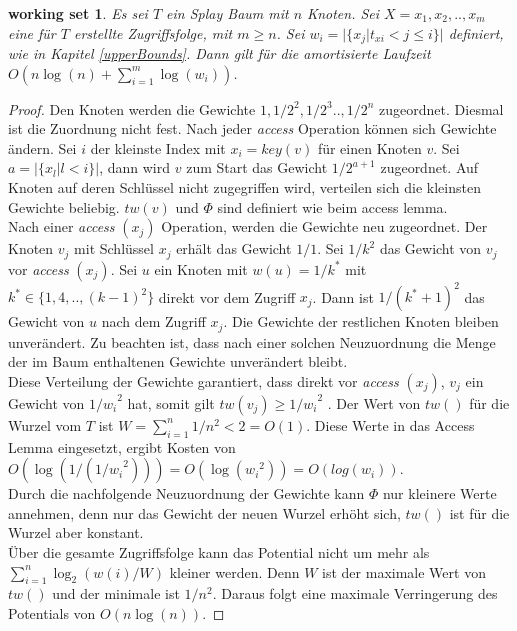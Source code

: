 \documentclass[a4paper,12pt]{article}
\begin{document}
\newtheorem{Satz2}{working set}[section] \label{workingSetSplay}
\begin{Satz2} Es sei $T$ ein Splay Baum mit $n$ Knoten. Sei $X = x_1,x_2,..,x_m$ eine für $T$ erstellte Zugriffsfolge, mit $m \geq n$. Sei ${w_i = \vert\{x_j \vert t_{xi} < j \leq i   \} \vert }$ definiert, wie in Kapitel \ref{upperBounds}. Dann gilt für die amortisierte Laufzeit \\
	$O\left( n \log\left(n\right) + \sum_{i = 1}^{m} \log\left( w_i\right) \right)$.
\end{Satz2}
\begin{proof}
	Den Knoten werden die Gewichte $1, 1/2^2,1/2^3 .., 1/2^n$ zugeordnet. Diesmal ist die Zuordnung nicht fest. Nach jeder \textit{access} Operation können sich Gewichte ändern. Sei $i$ der kleinste Index mit $x_i = \mathit{key}\left(v\right)$ für einen Knoten $v$. Sei $a = \vert\{x_l \vert l < i\}\vert$, dann wird $v$ zum Start das Gewicht $1 / 2^{a+1}$ zugeordnet. Auf Knoten auf deren Schlüssel nicht zugegriffen wird, verteilen sich die kleinsten Gewichte beliebig. $\mathit{tw}\left(v\right)$ und $\Phi$ sind definiert wie beim access lemma.\\
	Nach einer \textit{access} $\left(x_j\right)$ Operation, werden die Gewichte neu zugeordnet. Der Knoten $v_j$ mit Schlüssel $x_j$ erhält das Gewicht $1/1$. Sei $1/k^2$ das Gewicht von $v_j$ vor \textit{access} $\left(x_j\right)$. Sei $u$ ein Knoten mit $w\left(u\right) = 1 / k^*$ mit  $k^* \in \{1, 4,.., \left(k-1\right)^2\}$ direkt vor dem Zugriff $x_j$. Dann ist $1 /\left(k^* + 1\right)^2$ das Gewicht von $u$ nach dem Zugriff $x_j$. Die Gewichte der restlichen Knoten bleiben unverändert. Zu beachten ist, dass nach einer solchen Neuzuordnung die Menge der im Baum enthaltenen Gewichte unverändert bleibt. \\
	Diese Verteilung der Gewichte garantiert, dass direkt vor  \textit{access} $\left(x_j\right)$, $v_j$ ein Gewicht von ${1 /w_i}^2$ hat, somit gilt $\mathit{tw}\left(v_j\right) \geq {1 /w_i}^2$ . Der Wert von $\mathit{tw}\left(\right)$ für die Wurzel vom $T$ ist $W = \sum_{i = 1}^{n} 1/ n^2 < 2 = O\left(1\right) $. Diese Werte in das Access Lemma eingesetzt, ergibt Kosten von $O\left(\log\left(1 / \left({1 /w_i}^2\right)\right)\right) = O\left(\log\left({w_i}^2 \right)\right) = O\left(log\left(w_i\right)\right)$.\\
	 Durch die nachfolgende Neuzuordnung der Gewichte kann $\Phi$ nur kleinere Werte annehmen, denn nur das Gewicht der neuen Wurzel erhöht sich, $\mathit{tw}\left(\right)$ ist für die Wurzel aber konstant.\\
	Über die gesamte Zugriffsfolge kann das Potential nicht um mehr als $\sum_{i = 1}^{n} \log_2\left(w\left(i\right) / W\right)$ kleiner werden. Denn $W$ ist der maximale Wert von $\mathit{tw}\left(\right)$ und  der minimale ist $1 /n^2$. Daraus folgt eine maximale Verringerung des Potentials von $O\left(n \log \left(n\right)\right)$. 
\end{proof}
\end{document}
